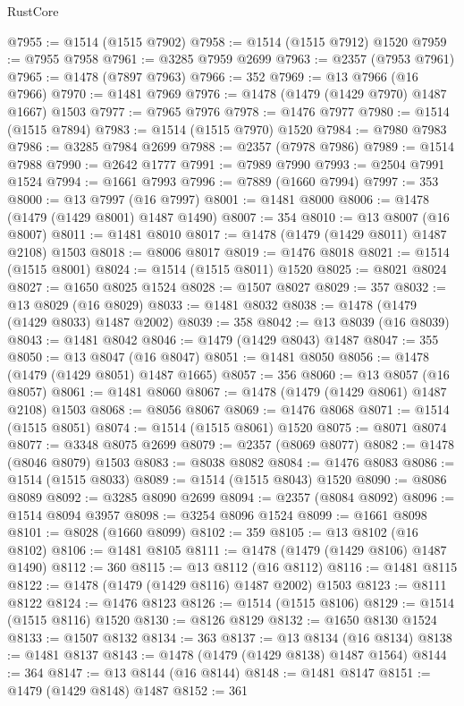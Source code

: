 \begin{lexlean}{RustCore}
\begin{coremodule}
@7955 := @1514 (@1515 @7902)
@7958 := @1514 (@1515 @7912) @1520
@7959 := @7955 @7958
@7961 := @3285 @7959 @2699
@7963 := @2357 (@7953 @7961)
@7965 := @1478 (@7897 @7963)
@7966 := 352
@7969 := @13 @7966 (@16 @7966)
@7970 := @1481 @7969
@7976 := @1478 (@1479 (@1429 @7970) @1487 @1667) @1503
@7977 := @7965 @7976
@7978 := @1476 @7977
@7980 := @1514 (@1515 @7894)
@7983 := @1514 (@1515 @7970) @1520
@7984 := @7980 @7983
@7986 := @3285 @7984 @2699
@7988 := @2357 (@7978 @7986)
@7989 := @1514 @7988
@7990 := @2642 @1777
@7991 := @7989 @7990
@7993 := @2504 @7991 @1524
@7994 := @1661 @7993
@7996 := @7889 (@1660 @7994)
@7997 := 353
@8000 := @13 @7997 (@16 @7997)
@8001 := @1481 @8000
@8006 := @1478 (@1479 (@1429 @8001) @1487 @1490)
@8007 := 354
@8010 := @13 @8007 (@16 @8007)
@8011 := @1481 @8010
@8017 := @1478 (@1479 (@1429 @8011) @1487 @2108) @1503
@8018 := @8006 @8017
@8019 := @1476 @8018
@8021 := @1514 (@1515 @8001)
@8024 := @1514 (@1515 @8011) @1520
@8025 := @8021 @8024
@8027 := @1650 @8025 @1524
@8028 := @1507 @8027
@8029 := 357
@8032 := @13 @8029 (@16 @8029)
@8033 := @1481 @8032
@8038 := @1478 (@1479 (@1429 @8033) @1487 @2002)
@8039 := 358
@8042 := @13 @8039 (@16 @8039)
@8043 := @1481 @8042
@8046 := @1479 (@1429 @8043) @1487
@8047 := 355
@8050 := @13 @8047 (@16 @8047)
@8051 := @1481 @8050
@8056 := @1478 (@1479 (@1429 @8051) @1487 @1665)
@8057 := 356
@8060 := @13 @8057 (@16 @8057)
@8061 := @1481 @8060
@8067 := @1478 (@1479 (@1429 @8061) @1487 @2108) @1503
@8068 := @8056 @8067
@8069 := @1476 @8068
@8071 := @1514 (@1515 @8051)
@8074 := @1514 (@1515 @8061) @1520
@8075 := @8071 @8074
@8077 := @3348 @8075 @2699
@8079 := @2357 (@8069 @8077)
@8082 := @1478 (@8046 @8079) @1503
@8083 := @8038 @8082
@8084 := @1476 @8083
@8086 := @1514 (@1515 @8033)
@8089 := @1514 (@1515 @8043) @1520
@8090 := @8086 @8089
@8092 := @3285 @8090 @2699
@8094 := @2357 (@8084 @8092)
@8096 := @1514 @8094 @3957
@8098 := @3254 @8096 @1524
@8099 := @1661 @8098
@8101 := @8028 (@1660 @8099)
@8102 := 359
@8105 := @13 @8102 (@16 @8102)
@8106 := @1481 @8105
@8111 := @1478 (@1479 (@1429 @8106) @1487 @1490)
@8112 := 360
@8115 := @13 @8112 (@16 @8112)
@8116 := @1481 @8115
@8122 := @1478 (@1479 (@1429 @8116) @1487 @2002) @1503
@8123 := @8111 @8122
@8124 := @1476 @8123
@8126 := @1514 (@1515 @8106)
@8129 := @1514 (@1515 @8116) @1520
@8130 := @8126 @8129
@8132 := @1650 @8130 @1524
@8133 := @1507 @8132
@8134 := 363
@8137 := @13 @8134 (@16 @8134)
@8138 := @1481 @8137
@8143 := @1478 (@1479 (@1429 @8138) @1487 @1564)
@8144 := 364
@8147 := @13 @8144 (@16 @8144)
@8148 := @1481 @8147
@8151 := @1479 (@1429 @8148) @1487
@8152 := 361

\end{coremodule}
\end{lexlean}
